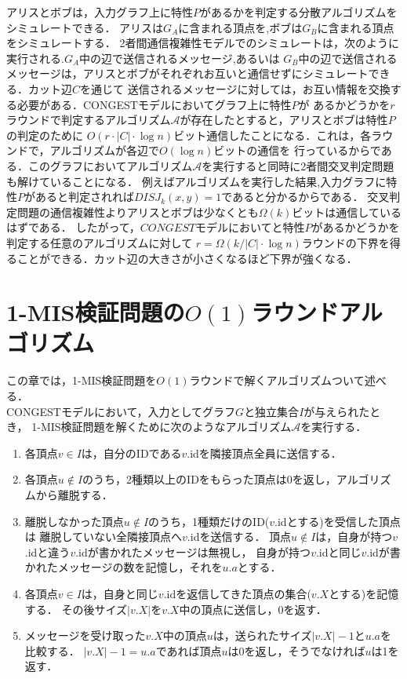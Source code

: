 \documentclass[12pt]{thesis}
\newcommand{\CONGEST}{\textsf{CONGEST}}
\theoremstyle{definition}
\begin{document}
アリスとボブは，入力グラフ上に特性$P$があるかを判定する分散アルゴリズムをシミュレートできる．
アリスは$G_{A}$に含まれる頂点を,ボブは$G_{B}$に含まれる頂点をシミュレートする．
2者間通信複雑性モデルでのシミュレートは，次のように実行される.$G_{A}$中の辺で送信されるメッセージ,あるいは
$G_{B}$中の辺で送信されるメッセージは，アリスとボブがそれぞれお互いと通信せずにシミュレートできる．カット辺$C$を通じて
送信されるメッセージに対しては，お互い情報を交換する必要がある．{\CONGEST}モデルにおいてグラフ上に特性$P$が
あるかどうかを$r$ラウンドで判定するアルゴリズム$\mathcal{A}$が存在したとすると，アリスとボブは特性$P$の判定のために
$O(r \cdot |C| \cdot \log n)$ビット通信したことになる．これは，各ラウンドで，アルゴリズムが各辺で$O(\log n)$ビットの通信を
行っているからである．このグラフにおいてアルゴリズム$\mathcal{A}$を実行すると同時に2者間交叉判定問題も解けていることになる．
例えばアルゴリズムを実行した結果,入力グラフに特性$P$があると判定されれば$DISJ_{k} (x, y)=1$であると分かるからである．
交叉判定問題の通信複雑性よりアリスとボブは少なくとも$\Omega (k)$ビットは通信しているはずである．
したがって，$CONGEST$モデルにおいてと特性$P$があるかどうかを判定する任意のアルゴリズムに対して
$r = \Omega (k / |C| \cdot \log n)$ラウンドの下界を得ることができる．カット辺の大きさが小さくなるほど下界が強くなる．
\newpage

\chapter{1-MIS検証問題の$O(1)$ラウンドアルゴリズム}
この章では，1-MIS検証問題を$O(1)$ラウンドで解くアルゴリズムついて述べる． \\
{\CONGEST}モデルにおいて，入力としてグラフ$G$と独立集合$I$が与えられたとき，
1-MIS検証問題を解くために次のようなアルゴリズム$\mathcal{A}$を実行する．
\begin{enumerate}
\item 各頂点$v \in I$は，自分のIDである$v$.idを隣接頂点全員に送信する．
\item 各頂点$u \notin I$のうち，2種類以上のIDをもらった頂点は0を返し，アルゴリズムから離脱する．
\item 離脱しなかった頂点$u \notin I$のうち，1種類だけのID($v$.idとする)を受信した頂点は
離脱していない全隣接頂点へ$v$.idを送信する．
頂点$u \notin I$は，自身が持つ$v$.idと違う$v$.idが書かれたメッセージは無視し，
自身が持つ$v$.idと同じ$v$.idが書かれたメッセージの数を記憶し，それを$u.a$とする．
\item 各頂点$v \in I$は，自身と同じ$v$.idを返信してきた頂点の集合($v.X$とする)を記憶する．
その後サイズ$|v.X|$を$v.X$中の頂点に送信し，0を返す．
\item メッセージを受け取った$v.X$中の頂点$u$は，送られたサイズ$|v.X| - 1$と$u.a$を比較する．
$|v.X | - 1 = u.a$であれば頂点$u$は$0$を返し，そうでなければ$u$は1を返す．
\end{enumerate}
\end{document}

